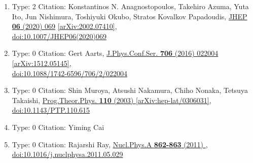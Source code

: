 \documentclass[a4paper,10pt]{article}
\begin{document}
\begin{enumerate}
\begin{enumerate}
  \item Type: 2 Citation: Konstantinos N. Anagnostopoulos, Takehiro Azuma, Yuta Ito, Jun Nishimura, Toshiyuki Okubo, Stratos Kovalkov Papadoudis, \href{https://www.doi.org/10.1007/JHEP06(2020)069}{JHEP {\bf 06} (2020) 069}  \href{https://arxiv.org/abs/2002.07410}{[arXiv:2002.07410]},\\\href{https://www.doi.org/10.1007/JHEP06(2020)069}{doi:10.1007/JHEP06(2020)069}
  \item Type: 0 Citation: Gert Aarts, \href{https://www.doi.org/10.1088/1742-6596/706/2/022004}{J.Phys.Conf.Ser. {\bf 706} (2016) 022004}  \href{https://arxiv.org/abs/1512.05145}{[arXiv:1512.05145]},\\\href{https://www.doi.org/10.1088/1742-6596/706/2/022004}{doi:10.1088/1742-6596/706/2/022004}
  \item Type: 0 Citation: Shin Muroya, Atsushi Nakamura, Chiho Nonaka, Tetsuya Takaishi, \href{https://www.doi.org/10.1143/PTP.110.615}{Prog.Theor.Phys. {\bf 110} (2003) }  \href{https://arxiv.org/abs/hep-lat/0306031}{[arXiv:hep-lat/0306031]},\\\href{https://www.doi.org/10.1143/PTP.110.615}{doi:10.1143/PTP.110.615}
  \item Type: 0 Citation: Yiming Cai
  \item Type: 0 Citation: Rajarshi Ray, \href{https://www.doi.org/10.1016/j.nuclphysa.2011.05.029}{Nucl.Phys.A {\bf 862-863} (2011) },\\\href{https://www.doi.org/10.1016/j.nuclphysa.2011.05.029}{doi:10.1016/j.nuclphysa.2011.05.029}

\end{enumerate}
\end{enumerate}
\end{document}
